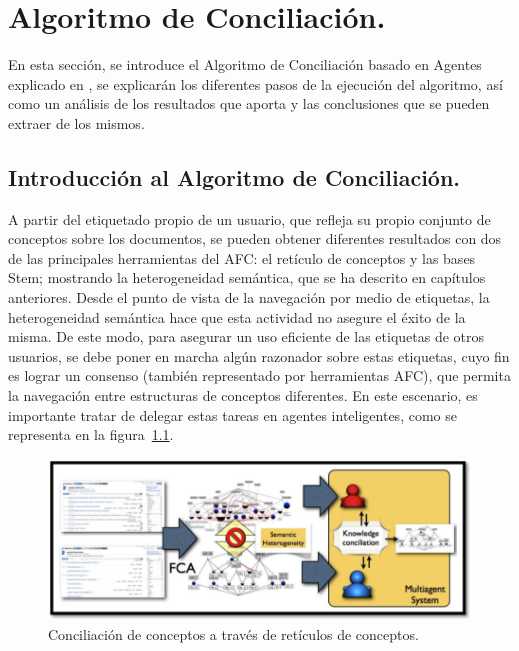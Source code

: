 \chapter{Algoritmo de Conciliación.}\label{cap:capitulo4}

En esta sección, se introduce el Algoritmo de Conciliación basado en Agentes explicado en \cite{algoritmo}, se explicarán los diferentes pasos de la ejecución del algoritmo, así como un análisis de los resultados que aporta y las conclusiones que se pueden extraer de los mismos.



\section{Introducción al Algoritmo de Conciliación.}

A partir del etiquetado propio de un usuario, que refleja su propio conjunto de conceptos sobre los documentos, se pueden obtener diferentes resultados con dos de las principales herramientas del AFC: el retículo de conceptos y las bases Stem; mostrando la heterogeneidad semántica, que se ha descrito en capítulos anteriores. Desde el punto de vista de la navegación por medio de etiquetas, la heterogeneidad semántica hace que esta actividad no asegure el éxito de la misma. De este modo, para asegurar un uso eficiente de las etiquetas de otros usuarios, se debe poner en marcha algún razonador sobre estas etiquetas, cuyo fin es lograr un consenso (también representado por herramientas AFC), que permita la navegación entre estructuras de conceptos diferentes. En este escenario, es importante tratar de delegar estas tareas en agentes inteligentes, como se representa en la figura~\ref{fig:smaGeneral}.

\begin{figure}[t]
\centering
\includegraphics[scale=0.9]{img/4/smaGeneral}
\caption{Conciliación de conceptos a través de retículos de conceptos.
\label{fig:smaGeneral}}
\end{figure}


